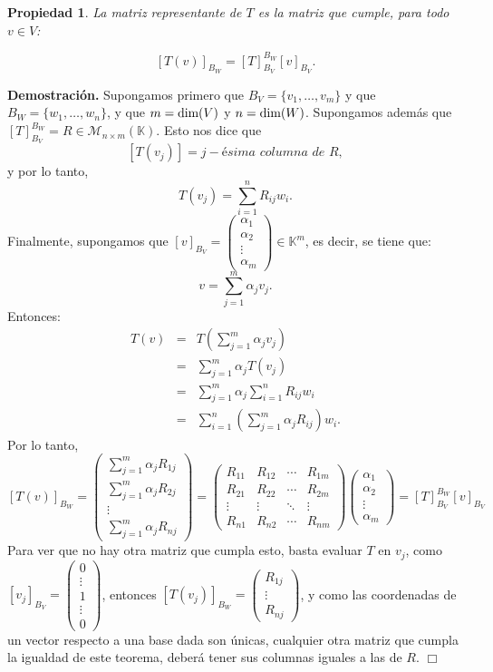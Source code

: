 \documentclass[12pt]{book}
\newtheorem{prop}{Propiedad}
\def\K{\mathbb{K}}
\def\M{\mathcal{M}}
\def\dim{\textup{dim}}
\begin{document}
\begin{prop}
La matriz representante de $T$ es la matriz que cumple, para todo $v\in V$:

$$ [T(v)]_{B_W}=[T]_{B_V}^{B_W}[v]_{B_V}.$$
\end{prop}
{\bf Demostración.}
Supongamos primero que $B_V=\{v_1,\dots,v_m\}$ y que $B_W=\{w_1,\dots,w_n\}$, y que $m=\dim(V)$ y $n=\dim(W)$.
Supongamos además que $[T]_{B_V}^{B_W}=R\in\M_{n\times m}(\K)$.
Esto nos dice que 
$$[T(v_j)]=j-\textit{ésima columna de }R,$$
y por lo tanto,
$$T(v_j)=\sum_{i=1}^n R_{ij} w_i.$$
Finalmente, supongamos que $[v]_{B_V}=\left(\begin{array}{c}
\alpha_1\\
\alpha_2\\
\vdots\\
\alpha_m
\end{array}\right)\in\K^m$, es decir, se tiene que:
$$v=\sum_{j=1}^m \alpha_j v_j.$$
Entonces:
\begin{eqnarray*}
T(v)&=&T\left(\sum_{j=1}^m \alpha_j v_j\right)\\
&=&\sum_{j=1}^m \alpha_j T(v_j)\\
&=&\sum_{j=1}^m \alpha_j \sum_{i=1}^n R_{ij} w_i\\
&=&\sum_{i=1}^n\left(\sum_{j=1}^m \alpha_j  R_{ij}\right) w_i.
\end{eqnarray*}
Por lo tanto,
$$[T(v)]_{B_W}=\left(\begin{array}{c}\sum_{j=1}^m \alpha_j  R_{1j}\\
\sum_{j=1}^m \alpha_j  R_{2j}\\
\vdots\\
\sum_{j=1}^m \alpha_j  R_{nj}\end{array}\right)=
\left(\begin{array}{cccc}
R_{11} & R_{12} & \cdots & R_{1m}\\
R_{21} & R_{22} & \cdots & R_{2m}\\
\vdots & \vdots & \ddots & \vdots\\
R_{n1} & R_{n2} & \cdots & R_{nm}
\end{array}\right)
\left(\begin{array}{c}
\alpha_1\\
\alpha_2\\
\vdots\\
\alpha_m
\end{array}\right)
=[T]_{B_V}^{B_W}[v]_{B_V}
$$
Para ver que no hay otra matriz que cumpla esto, basta evaluar $T$ en $v_j$, como $[v_j]_{B_V}=\left(\begin{array}{c}
0\\
\vdots\\
1\\
\vdots\\
0
\end{array}\right)$, entonces $[T(v_j)]_{B_W}=\left(\begin{array}{c}
R_{1j}\\
\vdots\\
R_{nj}
\end{array}\right)$, y como las coordenadas de un vector respecto a una base dada son únicas, cualquier otra matriz que cumpla la igualdad de este teorema, deberá tener sus columnas iguales a las de $R$.
\hfill $\Box$
\end{document}
